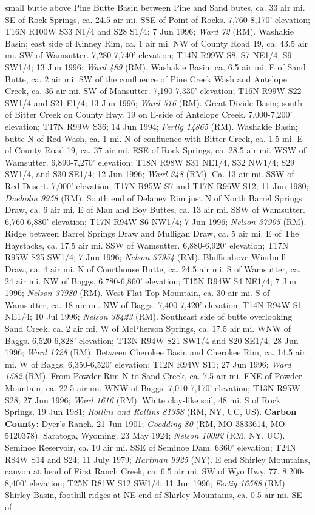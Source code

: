 small butte above Pine Butte Basin between Pine and Sand butes, ca. 33 air mi. SE of Rock Springs, ca. 24.5 air mi. SSE of Point of Rocks. 7,760-8,170' elevation; T16N R100W S33 N1/4 and S28 S1/4; 7 Jun 1996; \textit{Ward 72} (RM).  Washakie Basin; east side of Kinney Rim, ca. 1 air mi. NW of County Road 19, ca. 43.5 air mi. SW of Wamsutter. 7,280-7,740' elevation; T14N R99W S8, S7 NE1/4, S9 SW1/4; 13 Jun 1996; \textit{Ward 489} (RM).  Washakie Basin; ca. 6.5 air mi. E of Sand Butte, ca. 2 air mi. SW of the confluence of Pine Creek Wash and Antelope Creek, ca. 36 air mi. SW of Mansutter. 7,190-7,330' elevation; T16N R99W S22 SW1/4 and S21 E1/4; 13 Jun 1996; \textit{Ward 516} (RM).  Great Divide Basin; south of Bitter Creek on County Hwy. 19 on E-side of Antelope Creek. 7,000-7,200' elevation; T17N R99W S36; 14 Jun 1994; \textit{Fertig 14865} (RM).  Washakie Basin; butte N of Red Wash, ca. 1 mi. N of confluence with Bitter Creek, ca. 1.5 mi. E of County Road 19, ca. 37 air mi. ESE of Rock Springs, ca. 28.5 air mi. WSW of Wamsutter. 6,890-7,270' elevation; T18N R98W S31 NE1/4, S32 NW1/4; S29 SW1/4, and S30 SE1/4; 12 Jun 1996; \textit{Ward 248} (RM).  Ca. 13 air mi. SSW of Red Desert. 7,000' elevation; T17N R95W S7 and T17N R96W S12; 11 Jun 1980; \textit{Dueholm 9958} (RM). South end of Delaney Rim just N of North Barrel Springs Draw, ca. 6 air mi. E of Man and Boy Buttes, ca. 13 air mi. SSW of Wamsutter. 6,760-6,880' elevation; T17N R94W S6 NW1/4; 7 Jun 1996; \textit{Nelson 37905} (RM).  Ridge between Barrel Springs Draw and Mulligan Draw, ca. 5 air mi. E of The Haystacks, ca. 17.5 air mi. SSW of Wamsutter. 6,880-6,920' elevation; T17N R95W S25 SW1/4; 7 Jun 1996; \textit{Nelson 37954} (RM).  Bluffs above Windmill Draw, ca. 4 air mi. N of Courthouse Butte, ca. 24.5 air mi, S of Wamsutter, ca. 24 air mi. NW of Baggs. 6,780-6,860' elevation; T15N R94W S4 NE1/4; 7 Jun 1996; \textit{Nelson 37980} (RM).  West Flat Top Mountain, ca. 30 air mi. S of Wamsutter, ca. 18 air mi. NW of Baggs. 7,400-7,420' elevation; T14N R94W S1 NE1/4; 10 Jul 1996; \textit{Nelson 38423} (RM).  Southeast side of butte overlooking Sand Creek, ca. 2 air mi. W of McPherson Springs, ca. 17.5 air mi. WNW of Baggs. 6,520-6,828' elevation; T13N R94W S21 SW1/4 and S20 SE1/4; 28 Jun 1996; \textit{Ward	1728} (RM).  Between Cherokee Basin and Cherokee Rim, ca. 14.5 air mi. W of Baggs. 6,350-6,520' elevation; T12N R94W S11; 27 Jun 1996; \textit{Ward 1582} (RM).  From Powder Rim N to Sand Creek, ca. 7.5 air mi. ENE of Powder Mountain, ca. 22.5 air mi. WNW of Baggs. 7,010-7,170' elevation; T13N R95W S28; 27 Jun 1996; \textit{Ward 1616} (RM).  White clay-like soil, 48 mi. S of Rock Springs. 19 Jun 1981; \textit{Rollins and Rollins 81358} (RM, NY, UC, US).  \textbf{Carbon County:} Dyer’s Ranch. 21 Jun 1901; \textit{Goodding 80} (RM, MO-3833614, MO-5120378).  Saratoga, Wyoming. 23 May 1924; \textit{Nelson 10092} (RM, NY, UC).  Seminoe Reservoir, ca. 10 air mi. SSE of Seminoe Dam. 6360’ elevation; T24N R84W S14 and S24; 11 July 1979; \textit{Hartman 9925} (NY).  E end Shirley Mountains, canyon at head of First Ranch Creek, ca. 6.5 air mi. SW of Wyo Hwy. 77. 8,200-8,400’ elevation; T25N R81W S12 SW1/4; 11 Jun 1996; \textit{Fertig 16588} (RM). Shirley Basin, foothill ridges at NE end of Shirley Mountains, ca. 0.5 air mi. SE of 